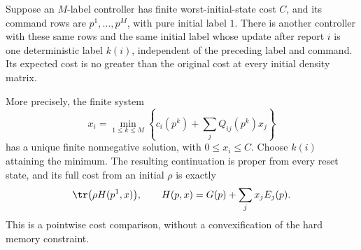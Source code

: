 \begin{theorem}
\label{thm:r78-palette-normal-form}
Suppose an $M$-label controller has finite worst-initial-state cost $C$,
and its command rows are $p^1,\ldots,p^M$, with pure initial label $1$.
There is another controller with these same rows and the same initial
label whose update after report $i$ is one deterministic label $k(i)$,
independent of the preceding label and command.  Its expected cost is
no greater than the original cost at every initial density matrix.

More precisely, the finite system
\begin{equation}\label{eq:r78-palette-bellman}
 x_i=\min_{1\le k\le M}
       \left\{c_i(p^k)+\sum_jQ_{ij}(p^k)x_j\right\}
\end{equation}
has a unique finite nonnegative solution, with $0\le x_i\le C$.
Choose $k(i)$ attaining the minimum.  The resulting continuation is
proper from every reset state, and its full cost from an initial $\rho$
is exactly
\begin{equation}\label{eq:r78-palette-start}
 \tr\bigl(\rho H(p^1,x)\bigr),\qquad
 H(p,x)=G(p)+\sum_jx_jE_j(p).
\end{equation}
This is a pointwise cost comparison, without a convexification of the
hard memory constraint.
\end{theorem}
